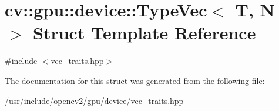 \hypertarget{structcv_1_1gpu_1_1device_1_1TypeVec}{\section{cv\-:\-:gpu\-:\-:device\-:\-:Type\-Vec$<$ T, N $>$ Struct Template Reference}
\label{structcv_1_1gpu_1_1device_1_1TypeVec}
}


{\ttfamily \#include $<$vec\-\_\-traits.\-hpp$>$}



The documentation for this struct was generated from the following file\-:\begin{DoxyCompactItemize}
\item 
/usr/include/opencv2/gpu/device/\hyperlink{vec__traits_8hpp}{vec\-\_\-traits.\-hpp}\end{DoxyCompactItemize}
